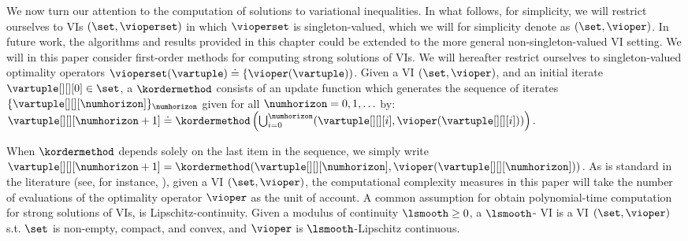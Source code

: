 We now turn our attention to the computation of solutions to variational inequalities. In what follows, for simplicity, we will restrict ourselves to VIs $(\set, \vioperset)$ in which $\vioperset$ is singleton-valued, which we will for simplicity denote as $(\set, \vioper)$. In future work, the algorithms and results provided in this chapter could be extended to the more general non-singleton-valued VI setting.
% 
We will in this paper consider first-order methods for computing strong solutions of VIs. We will hereafter restrict ourselves to singleton-valued optimality operators $\vioperset(\vartuple) \doteq \{\vioper(\vartuple))$.
Given a VI $(\set, \vioper)$, and an initial iterate $\vartuple[][][0] \in \set$, a  $\kordermethod$ consists of an update function which generates the sequence of iterates $\{\vartuple[][][\numhorizon]\}_{\numhorizon}$ given for all $\numhorizon = 0, 1, \hdots$ by:
$
    \vartuple[][][\numhorizon + 1] \doteq  \kordermethod \left(\bigcup_{i = 0}^{\numhorizon} (\vartuple[][][i],  \vioper(\vartuple[][][i])) \right).
$

When $\kordermethod$ depends solely on the last item in the sequence, we simply write $ \vartuple[][][\numhorizon + 1] = \kordermethod(\vartuple[][][\numhorizon],  \vioper(\vartuple[][][\numhorizon]))$. As is standard in the literature (see, for instance, \citet{cai2022tight}), given a VI $(\set, \vioper)$, the computational complexity measures in this paper will take the number of evaluations of the optimality operator $\vioper$ as the unit of account.
% 
A common assumption for obtain polynomial-time computation for strong solutions of VIs, is Lipschitz-continuity. Given a modulus of continuity $\lsmooth \geq 0$, a $\lsmooth$- VI is a VI $(\set, \vioper)$ s.t. $\set$ is non-empty, compact, and convex, and $\vioper$ is $\lsmooth$-Lipschitz continuous.

